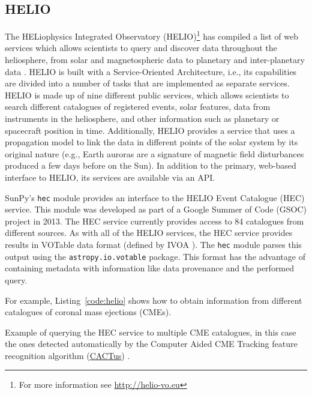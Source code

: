 \subsection{HELIO}\label{ssec:helio}

The HELiophysics Integrated Observatory (HELIO)\footnote{For more information 
see \url{http://helio-vo.eu}} has 
compiled a list of web services which allows scientists to query and 
discover data throughout the heliosphere, from solar and magnetospheric data to planetary and 
inter-planetary data \citep{dps2012}.
HELIO is built with a Service-Oriented Architecture, 
i.e., its capabilities are divided into a number of tasks that are 
implemented as separate services. 
HELIO is made up of nine different public services, 
which allows scientists to search different catalogues of registered events, 
solar features, data from instruments in the heliosphere, and other information 
such as planetary or spacecraft position in time. 
Additionally, HELIO provides a service that uses a 
propagation model to link the data in different points of the solar system by 
its original nature (e.g., Earth auroras are a signature of magnetic 
field disturbances produced a few days before on the Sun).
In addition to the primary, web-based interface to 
HELIO, its services are available via an API.

SunPy's \texttt{hec} module provides an interface to the
HELIO Event Catalogue (HEC) service. 
This module was developed as
part of a Google Summer of Code (GSOC) project in 2013.
The HEC service currently provides access to 84 catalogues from different
sources.
As with all of the HELIO services, the HEC service provides results in VOTable 
data format (defined by IVOA \cite{ochsenbein_ivoa_2011}).
The \texttt{hec} module parses this output using the \texttt{astropy.io.votable} package.
This format has the advantage of containing metadata with information like
data provenance and the performed query.

For example, Listing~\ref{code:helio} shows how to obtain information
from different catalogues of coronal mass ejections (CMEs).

\begin{listing}[h]
\caption{Example of querying the HEC service to multiple CME
catalogues, in this case the ones detected automatically 
by the Computer Aided CME Tracking feature recognition algorithm (\href{http://sidc.oma.be/cactus/}{CACTus}) \citep{robbrecht_automated_2009}.}
\label{code:helio}
\end{listing}